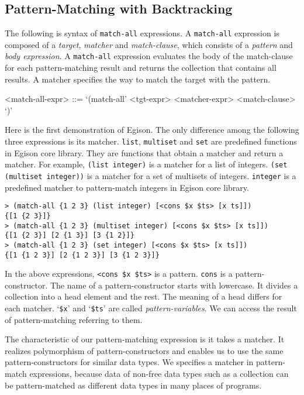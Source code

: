 \documentclass{article}
\begin{document}
\subsection{Pattern-Matching with Backtracking}

The following is syntax of \texttt{match-all} expressions.
A \texttt{match-all} expression is composed of a \textit{target}, \textit{matcher} and \textit{match-clause}, which consists of a \textit{pattern} and \textit{body expression}.
A \texttt{match-all} expression evaluates the body of the match-clause for each pattern-matching result and returns the collection that contains all results.
A matcher specifies the way to match the target with the pattern.

\begin{grammar}
<match-all-expr> ::= `(match-all' <tgt-expr> <matcher-expr> <match-clause> `)'
\end{grammar}

Here is the first demonstration of Egison.
The only difference among the following three expressions is its matcher.
\texttt{list}, \texttt{multiset} and \texttt{set} are predefined functions in Egison core library.
They are functions that obtain a matcher and return a matcher.
For example, \texttt{(list integer)} is a matcher for a list of integers.
\texttt{(set (multiset integer))} is a matcher for a set of multisets of integers.
\texttt{integer} is a predefined matcher to pattern-match integers in Egison core library.

{\footnotesize
\begin{verbatim}
> (match-all {1 2 3} (list integer) [<cons $x $ts> [x ts]])
{[1 {2 3}]}
> (match-all {1 2 3} (multiset integer) [<cons $x $ts> [x ts]])
{[1 {2 3}] [2 {1 3}] [3 {1 2}]}
> (match-all {1 2 3} (set integer) [<cons $x $ts> [x ts]])
{[1 {1 2 3}] [2 {1 2 3}] [3 {1 2 3}]}
\end{verbatim}
}

In the above expressions, \texttt{<cons \$x \$ts>} is a pattern.
\texttt{cons} is a pattern-constructor.
The name of a pattern-constructor starts with lowercase.
It divides a collection into a head element and the rest.
The meaning of a head differs for each matcher.
`\texttt{\$x}' and `\texttt{\$ts}' are called \textit{pattern-variables}.
We can access the result of pattern-matching referring to them.

The characteristic of our pattern-matching expression is it takes a matcher.
It realizes polymorphism of pattern-constructors and enables us to use the same pattern-constructors for similar data types.
We specifies a matcher in pattern-match expressions, because data of non-free data types such as a collection can be pattern-matched as different data types in many places of programs.
\end{document}
